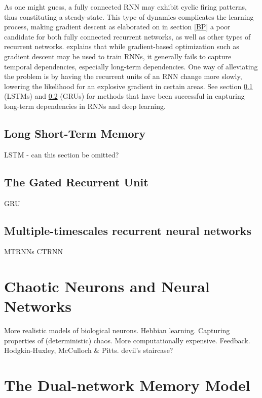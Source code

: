 As one might guess, a fully connected RNN may exhibit cyclic firing patterns, thus constituting a steady-state. This type of dynamics complicates the learning process, making gradient descent as elaborated on in section \ref{BP} a poor candidate for both fully connected recurrent networks, as well as other types of recurrent networks. \cite{Bengio2013b} explains that while gradient-based optimization such as gradient descent may be used to train RNNs, it generally fails to capture temporal dependencies, especially long-term dependencies. One way of alleviating the problem is by having the recurrent units of an RNN change more slowly, lowering the likelihood for an explosive gradient in certain areas. See section \ref{LSTM} (LSTMs) and \ref{GRU} (GRUs) for methods that have been successful in capturing long-term dependencies in RNNs and deep learning.

\subsection{Long Short-Term Memory}\label{LSTM}

LSTM - can this section be omitted?


\subsection{The Gated Recurrent Unit}\label{GRU}

GRU

\subsection{Multiple-timescales recurrent neural networks}

MTRNNs
CTRNN
\cite{Tani2014}


\section{Chaotic Neurons and Neural Networks}

More realistic models of biological neurons. Hebbian learning. Capturing properties of (deterministic) chaos. More computationally expensive. Feedback. Hodgkin-Huxley, McCulloch \& Pitts. devil's staircase?
\cite{McCulloch1943}


\section{The Dual-network Memory Model}

